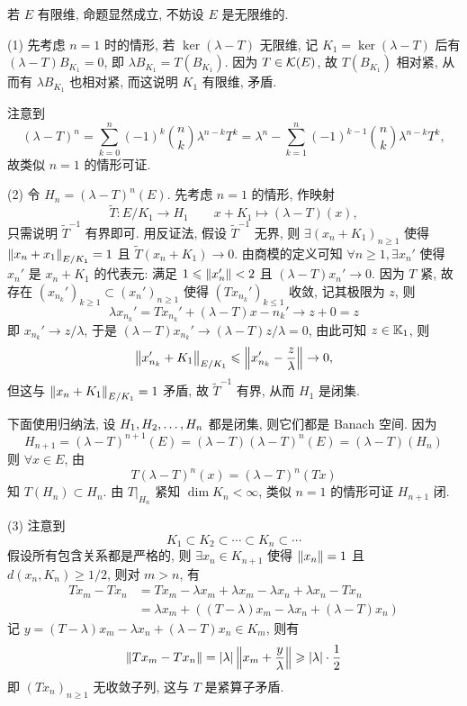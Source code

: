    \begin{Proof}
        若 $ E $ 有限维, 命题显然成立, 不妨设 $ E $ 是无限维的.

        (1) 先考虑 $ n=1 $ 时的情形, 若 $ \ker(\lambda-T) $ 无限维, 记 $ K_{1}=\ker(\lambda-T) $ 后有 $ (\lambda-T)B_{K_{1}}=0 $, 即 $ \lambda B_{K_{1}}=T(B_{K_{1}}) $. 因为 $ T\in\mathcal{K}(E) $, 故 $ T(B_{K_{1}}) $ 相对紧, 从而有 $ \lambda B_{K_{1}} $ 也相对紧, 而这说明 $ K_{1} $ 有限维, 矛盾.

        注意到
        \[
            (\lambda-T)^{n}=\sum_{k=0}^{n}(-1)^{k}\binom{n}{k}\lambda^{n-k}T^{k} = \lambda^{n}-\sum_{k=1}^{n}(-1)^{k-1}\binom{n}{k}\lambda^{n-k}T^{k},
        \]
        故类似 $ n=1 $ 的情形可证.

        (2) 令 $ H_{n}= (\lambda-T)^{n}(E) $. 先考虑 $ n=1 $ 的情形, 作映射
        \[
            \tilde{T}: E/K_{1}\to H_{1}\qquad x+K_{1}\mapsto (\lambda-T)(x),
        \]
        只需说明 $ \tilde{T}^{-1} $ 有界即可. 用反证法, 假设 $ \tilde{T}^{-1} $ 无界, 则 $ \exists (x_{n}+K_{1})_{n\geqslant1} $ 使得 $ \left\| x_{n}+x_{1} \right\|_{E/K_{1}}=1 $ 且 $ \tilde{T}(x_{n}+K_{1})\to 0 $. 由商模的定义可知 $ \forall n\geqslant1, \exists x_{n}' $ 使得  $ x_{n}' $ 是 $ x_{n}+K_{1} $ 的代表元: 满足 $ 1\leqslant\left\| x_{n}' \right\|<2 $ 且 $ (\lambda-T)x_{n}'\to 0 $. 因为 $ T $ 紧, 故存在 $ (x_{n_{k}}')_{k\geqslant1}\subset(x_{n}')_{n\geqslant1} $ 使得 $ (Tx_{n_{k}}')_{k\leqslant1} $ 收敛, 记其极限为 $ z $, 则
        \[
            \lambda x_{n_{k}}'=Tx_{n_{k}}'+(\lambda-T)x-{n_{k}}'\to z+0=z
        \]
        即 $ x_{n_{k}}'\to z/\lambda $, 于是 $ (\lambda-T)x_{n_{k}}'\to (\lambda-T)z/\lambda=0 $, 由此可知 $ z\in\mathbb{K}_{1} $, 则
        \[
            \left\| x_{n_{k}}'+K_{1} \right\|_{E/K_{1}}\leqslant\left\| x_{n_{k}}'-\frac{z}{\lambda} \right\|\to 0,
        \]
        但这与 $ \left\| x_{n}+K_{1} \right\|_{E/K_{1}}=1 $ 矛盾, 故 $ \tilde{T}^{-1} $ 有界, 从而 $ H_{1} $ 是闭集.

        下面使用归纳法, 设 $ H_{1}, H_{2}, \dots, H_{n} $ 都是闭集, 则它们都是 Banach 空间. 因为
        \[
            H_{n+1}=(\lambda-T)^{n+1}(E)=(\lambda-T)(\lambda-T)^{n}(E)=(\lambda-T)(H_{n})
        \]
        则 $ \forall x\in E $, 由
        \[
            T(\lambda-T)^{n}(x)=(\lambda-T)^{n}(Tx)
        \]
        知 $ T(H_{n})\subset H_{n} $. 由 $ T|_{H_{n}} $ 紧知 $ \dim K_{n}<\infty $, 类似 $ n=1 $ 的情形可证 $ H_{n+1} $ 闭.

        (3) 注意到
        \[
            K_{1}\subset K_{2}\subset\cdots\subset K_{n}\subset\cdots
        \]
        假设所有包含关系都是严格的, 则 $ \exists x_{n}\in K_{n+1} $ 使得 $ \left\| x_{n} \right\|=1 $ 且 $ d(x_{n}, K_{n})\geqslant1/2 $, 则对 $ m>n $, 有
        \[
            \begin{aligned}
                Tx_{m}-Tx_{n} & = Tx_{m}-\lambda x_{m}+\lambda x_{m}-\lambda x_{n}+\lambda x_{n}-Tx_{n}\\
                & = \lambda x_{m}+((T-\lambda)x_{m}-\lambda x_{n}+(\lambda-T)x_{n})
            \end{aligned}
        \]
        记 $ y=(T-\lambda)x_{m}-\lambda x_{n}+(\lambda-T)x_{n}\in K_{m} $, 则有
        \[
            \left\| Tx_{{m}}-Tx_{n} \right\|=\left| \lambda \right| \left\| x_{m}+\frac{y}{\lambda} \right\|\geqslant\left| \lambda \right| \cdot\frac{1}{2}
        \]
        即 $ (Tx_{n})_{n\geqslant1} $ 无收敛子列, 这与 $ T $ 是紧算子矛盾.


\end{Proof}
